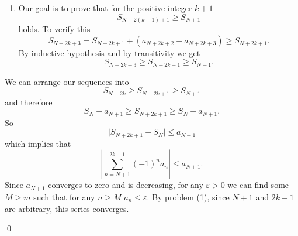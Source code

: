\documentclass{article}
\theoremstyle{remark}
\begin{document}
\begin{enumerate}
\begin{enumerate}
\begin{enumerate}
            \[
            S_{N+2k+1} \geq S_{N+1}.
            \]
            \item[\textbf{Thesis.}]
            Our goal is to prove that for the positive integer $k+1$
            \[
            S_{N+2(k+1) + 1 } \geq S_{N+1}
            \]
            holds. 
            To verify this
            \[
            S_{N+2k+3} = S_{N+2k+1} + (a_{N+2k+2} - a_{N+2k+3}) \geq S_{N+2k+1}. 
            \]
            By inductive hypothesis and by transitivity we get
            \[
            S_{N+2k+3} \geq S_{N+2k+1} \geq S_{N+1}.
            \] 
        \end{enumerate}
        We can arrange our sequences into 
        \[
        S_{N+2k} \geq S_{N+2k+1} \geq S_{N+1}
        \]
        and therefore 
        \[
        S_{N} + a_{N+1} \geq S_{N+2k+1} \geq S_{N}-a_{N+1}.
        \]
        So 
        \[
        \vert S_{N+2k+1} - S_{N} \vert \leq a_{N+1}
        \]
        which implies that 
        \[
        \left \lvert \sum_{n=N+1}^{2k+1} (-1)^n a_n \right \rvert \leq a_{N+1}.
        \]
        Since $a_{N+1}$ converges to zero and is decreasing, for any $\varepsilon > 0$ we can find some $M \geq m$ such that for any $n \geq M$
        $a_{n} \leq \varepsilon$.
        By problem (1), since $N+1$ and $2k+1$ are arbitrary, this series converges.
        \begin{flushright}
            \qed
        \end{flushright}

    \end{enumerate}


\end{enumerate}
\end{document}
